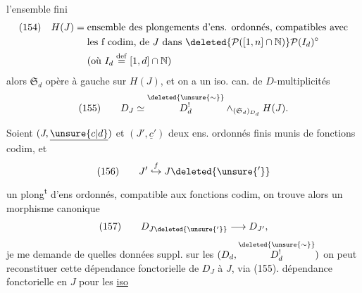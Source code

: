 l'ensemble fini
\[
\begin{aligned}
(154)\quad H(J)={}&\text{ensemble des plongements d'ens. ordonnés, compatibles avec}\\
&\text{les f codim, de }J\text{ dans }\deleted{\mathcal P([1,n]\cap\mathbb N)}\mathcal P(I_d)^\circ\\
&\text{(où }I_d\overset{\mathrm{def}}=[1,d]\cap\mathbb N\text{)}
\end{aligned}
\]
alors $\mathfrak S_d$ opère à gauche sur $H(J)$, et on a un iso. can. de $D$-multiplicités
\[
(155)\qquad D_J\simeq\overset{\deleted{\unsure{\sim}}}{D^!_d}\mathbin{\wedge}_{(\mathfrak S_d)_{D_d}}H(J).
\]

Soient  $(J,\underline{\unsure{c|d}})$ et $(J',\underline{c}')$ deux ens. ordonnés finis munis de fonctions codim, et
\[
(156)\qquad J'\mathrel{\overset{f}{\hookrightarrow}}J\deleted{\unsure{'}}
\]
un plong\textsuperscript{t} d'ens ordonnés, compatible aux fonctions codim, on trouve alors un  morphisme canonique
\[
(157)\qquad D_{J\deleted{\unsure{'}}}\longrightarrow D_{J'},
\]
je me demande  de quelles données suppl.  sur les $(D_d,\overset{\deleted{\unsure{\sim}}}{D^!_d})$ on peut reconstituer cette dépendance fonctorielle de $D_J$  à $J$, via (155).   dépendance fonctorielle en $J$ pour les \uline{iso}
